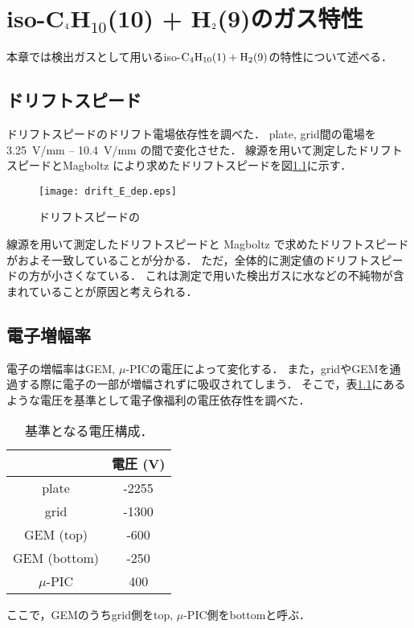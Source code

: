 \documentclass[../master]{subfiles}
\begin{document}
\chapter{iso-C$_{\text 4}$H$_{\text{10}}$(10) + H$_{\text 2}$(9)のガス特性}
本章では検出ガスとして用いるiso-$\rm C_{4}H_{10} (1) + H_{2} (9)$の特性について述べる．
\section{ドリフトスピード}
ドリフトスピードのドリフト電場依存性を調べた．
plate, grid間の電場を\SI{3.25}{\volt/\milli\metre} -- \SI{10.4}{\volt/\milli\metre} の間で変化させた．
線源を用いて測定したドリフトスピードとMagboltz により求めたドリフトスピードを図\ref{fig::drift_speed_E_dep}に示す．
\begin{figure}
  \centering
  \texttt{[image: drift\_E\_dep.eps]}
  \caption{ドリフトスピードの}
  \label{fig::drift_speed_E_dep}
\end{figure}
線源を用いて測定したドリフトスピードと Magboltz で求めたドリフトスピードがおよそ一致していることが分かる．
ただ，全体的に測定値のドリフトスピードの方が小さくなている．
これは測定で用いた検出ガスに水などの不純物が含まれていることが原因と考えられる．

\section{電子増幅率}
電子の増幅率はGEM, $\mu$-PICの電圧によって変化する．
また，gridやGEMを通過する際に電子の一部が増幅されずに吸収されてしまう．
そこで，表\ref{tab::voltage_configuration}にあるような電圧を基準として電子像福利の電圧依存性を調べた．
\begin{table}
  \centering
  \caption{基準となる電圧構成．}
  \label{tab::voltage_configuration}
  \begin{tabular}{cc}
    \toprule
    & 電圧 (\si{\volt})\\
    \midrule
    plate & -2255 \\
    grid & -1300 \\
    GEM (top) & -600 \\
    GEM (bottom) & -250 \\
    $\mu$-PIC & 400\\
    \bottomrule 
  \end{tabular}
\end{table}
ここで，GEMのうちgrid側をtop, $\mu$-PIC側をbottomと呼ぶ．
\end{document}
